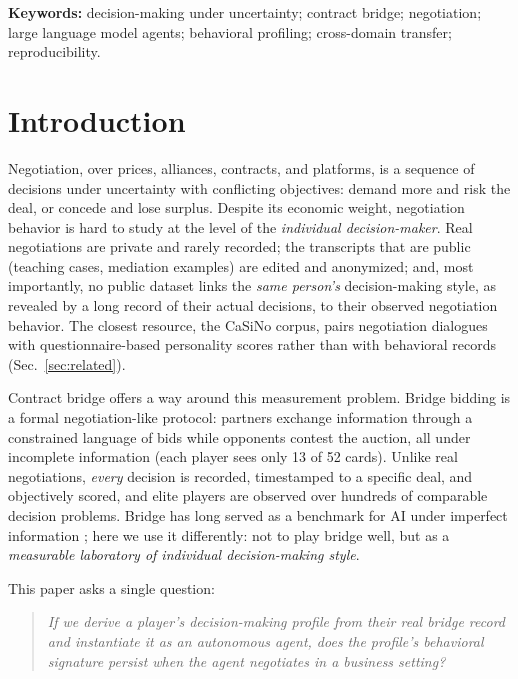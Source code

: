 \documentclass[11pt,a4paper]{article}
\begin{document}
\vspace{0.5em}
\noindent\textbf{Keywords:} decision-making under uncertainty; contract
bridge; negotiation; large language model agents; behavioral profiling;
cross-domain transfer; reproducibility.

\section{Introduction}\label{sec:intro}

Negotiation, over prices, alliances, contracts, and platforms, is a
sequence of decisions under uncertainty with conflicting objectives:
demand more and risk the deal, or concede and lose surplus. Despite its
economic weight, negotiation behavior is hard to study at the level of
the \emph{individual decision-maker}. Real negotiations are private and
rarely recorded; the transcripts that are public (teaching cases,
mediation examples) are edited and anonymized; and, most importantly, no
public dataset links the \emph{same person's} decision-making style, as
revealed by a long record of their actual decisions, to their observed
negotiation behavior. The closest resource, the CaSiNo corpus, pairs
negotiation dialogues with questionnaire-based personality scores rather
than with behavioral records (Sec.~\ref{sec:related}).

Contract bridge offers a way around this measurement problem. Bridge
bidding is a formal negotiation-like protocol: partners exchange
information through a constrained language of bids while opponents
contest the auction, all under incomplete information (each player sees
only 13 of 52 cards). Unlike real negotiations, \emph{every} decision is
recorded, timestamped to a specific deal, and objectively scored, and
elite players are observed over hundreds of comparable decision
problems. Bridge has long served as a benchmark for AI under imperfect
information \cite{ginsberg2001gib,rong2019bridge}; here we use it
differently: not to play bridge well, but as a \emph{measurable
laboratory of individual decision-making style}.

This paper asks a single question:

\begin{quote}
\emph{If we derive a player's decision-making profile from their real
bridge record and instantiate it as an autonomous agent, does the
profile's behavioral signature persist when the agent negotiates in a
business setting?}
\end{quote}
\end{document}
